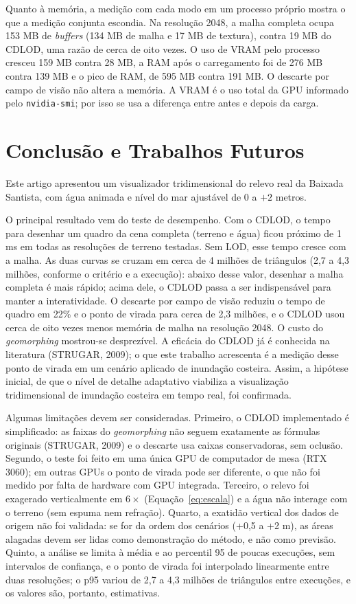 \documentclass[conference]{IEEEtran}
\begin{document}
Quanto à memória, a medição com cada modo em um processo próprio mostra o que a medição conjunta escondia. Na resolução 2048, a malha completa ocupa 153 MB de \emph{buffers} (134 MB de malha e 17 MB de textura), contra 19 MB do CDLOD, uma razão de cerca de oito vezes. O uso de VRAM pelo processo cresceu 159 MB contra 28 MB, a RAM após o carregamento foi de 276 MB contra 139 MB e o pico de RAM, de 595 MB contra 191 MB. O descarte por campo de visão não altera a memória. A VRAM é o uso total da GPU informado pelo \texttt{nvidia-smi}; por isso se usa a diferença entre antes e depois da carga.

\section{Conclusão e Trabalhos Futuros}
\label{sec:conclusao}

Este artigo apresentou um visualizador tridimensional do relevo real da
Baixada Santista, com água animada e nível do mar ajustável de 0 a $+2$ metros.

O principal resultado vem do teste de desempenho. Com o CDLOD, o tempo para
desenhar um quadro da cena completa (terreno e água) ficou próximo de 1 ms
em todas as resoluções de terreno testadas. Sem LOD, esse tempo cresce com a malha. As duas curvas se cruzam em cerca de 4 milhões de triângulos (2,7 a 4,3 milhões, conforme o critério e a execução): abaixo desse valor, desenhar a malha completa é mais rápido; acima dele, o CDLOD passa a ser indispensável para manter a interatividade. O descarte por campo de visão reduziu o tempo de quadro em 22\% e o ponto de virada para cerca de 2,3 milhões, e o CDLOD usou cerca de oito vezes menos memória de malha na resolução 2048. O custo do \emph{geomorphing} mostrou-se desprezível. A eficácia do CDLOD já é conhecida na literatura (STRUGAR,
2009); o que este trabalho acrescenta é a medição desse ponto de virada em
um cenário aplicado de inundação costeira. Assim, a hipótese inicial, de que o nível de detalhe adaptativo
viabiliza a visualização tridimensional de inundação costeira em tempo real,
foi confirmada.

Algumas limitações devem ser consideradas. Primeiro, o CDLOD implementado é simplificado: as faixas do \emph{geomorphing} não seguem exatamente as fórmulas originais (STRUGAR, 2009) e o descarte usa caixas conservadoras, sem oclusão. Segundo, o teste foi feito em uma única GPU de computador de mesa (RTX 3060); em outras GPUs o ponto de virada pode ser diferente, o que não foi medido por falta de hardware com GPU integrada. Terceiro, o relevo foi exagerado verticalmente em $6\times$ (Equação~\eqref{eq:escala}) e a água não interage com o terreno (sem espuma nem refração). Quarto, a exatidão vertical dos dados de origem não foi validada: se for da ordem dos cenários (+0,5 a +2 m), as áreas alagadas devem ser lidas como demonstração do método, e não como previsão. Quinto, a análise se limita à média e ao percentil 95 de poucas execuções, sem intervalos de confiança, e o ponto de virada foi interpolado linearmente entre duas resoluções; o p95 variou de 2,7 a 4,3 milhões de triângulos entre execuções, e os valores são, portanto, estimativas.
\end{document}
